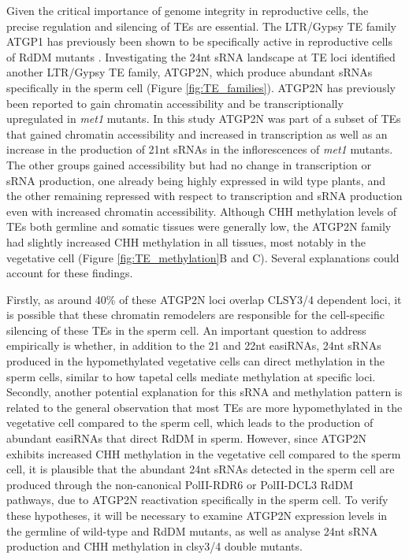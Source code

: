Given the critical importance of genome integrity in reproductive cells, the precise regulation and silencing of TEs are essential. The LTR/Gypsy TE family ATGP1 has previously been shown to be specifically active in reproductive cells of RdDM mutants \citep{RN187}. Investigating the 24nt sRNA landscape at TE loci identified another LTR/Gypsy TE family, ATGP2N, which produce abundant sRNAs specifically in the sperm cell (Figure \ref{fig:TE_families}). ATGP2N has previously been reported to gain chromatin accessibility and be transcriptionally upregulated in \textit{met1} mutants. In this study ATGP2N was part of a subset of TEs that gained chromatin accessibility and increased in transcription as well as an increase in the production of 21nt sRNAs in the inflorescences of \textit{met1} mutants. The other groups gained accessibility but had no change in transcription or sRNA production, one already being highly expressed in wild type plants, and the other remaining repressed with respect to transcription and sRNA production even with increased chromatin accessibility\citep{RN184}. Although CHH methylation levels of TEs  both germline and somatic tissues were generally low, the ATGP2N family had slightly increased CHH methylation in all tissues, most notably in the vegetative cell (Figure \ref{fig:TE_methylation}B and C). Several explanations could account for these findings. 

Firstly, as around 40\% of these ATGP2N loci overlap CLSY3/4 dependent loci, it is possible that these chromatin remodelers are responsible for the cell-specific silencing of these TEs in the sperm cell. An important question to address empirically is whether, in addition to the 21 and 22nt easiRNAs, 24nt sRNAs produced in the hypomethylated vegetative cells can direct methylation in the sperm cells, similar to how tapetal cells mediate methylation at specific loci. Secondly, another potential explanation for this sRNA and methylation pattern is related to the general observation that most TEs are more hypomethylated in the vegetative cell compared to the sperm cell, which leads to the production of abundant easiRNAs that direct RdDM in sperm.  However, since ATGP2N exhibits increased CHH methylation in the vegetative cell compared to the sperm cell, it is plausible that the abundant 24nt sRNAs detected in the sperm cell are produced through the non-canonical PolII-RDR6 or PolII-DCL3 RdDM pathways, due to ATGP2N reactivation specifically in the sperm cell. To verify these hypotheses, it will be necessary to examine ATGP2N expression levels in the germline of wild-type and RdDM mutants, as well as analyse 24nt sRNA production and CHH methylation in clsy3/4 double mutants.

